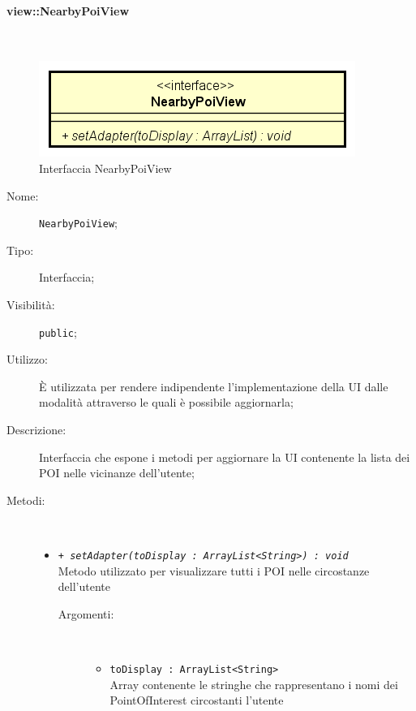 \documentclass[../DefinizioneDiProdotto.tex]{subfiles}
\begin{document}
\paragraph{view::NearbyPoiView}
\
\begin{figure}[H]
	\centering
	\includegraphics[width=\maxwidth]{img/NearbyPoiView.png}
	\caption{Interfaccia NearbyPoiView}\label{fig:view::NearbyPoiView} 
\end{figure}
\begin{description}
	\item[Nome:] \texttt{NearbyPoiView};
	\item[Tipo:] Interfaccia;
	\item[Visibilità:] \texttt{public};
	\item[Utilizzo:] È utilizzata per rendere indipendente l'implementazione della UI dalle modalità attraverso le quali è possibile aggiornarla;
	\item[Descrizione:] Interfaccia che espone i metodi per aggiornare la UI contenente la lista dei POI nelle vicinanze dell'utente;
	\item[Metodi:] \
	\begin{itemize}
		\item \texttt{+ \textit{setAdapter(toDisplay : ArrayList<String>) : void}}\\
		Metodo utilizzato per visualizzare tutti i POI nelle circostanze dell'utente
		\begin{description}
			\item[Argomenti:] \
			\begin{itemize}
				\item \texttt{toDisplay : ArrayList<String>}\\
				Array contenente le stringhe che rappresentano i nomi dei PointOfInterest circostanti l'utente\end{itemize}
		\end{description}
	\end{itemize}
\end{description}
\end{document}
